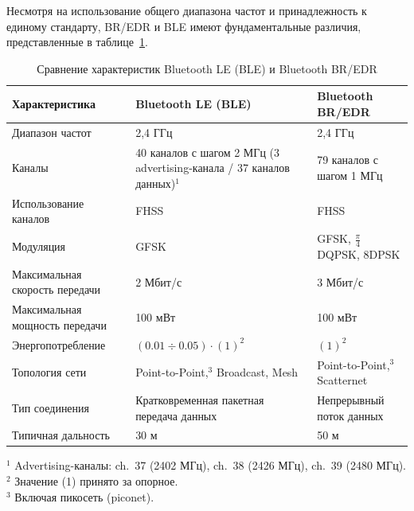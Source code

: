 Несмотря на использование общего диапазона частот и принадлежность к единому стандарту, BR/EDR и BLE имеют фундаментальные различия, представленные в таблице~\ref{tab:ble_bredr_compare}.

\begin{table}[H]
\centering
\caption{Сравнение характеристик Bluetooth LE (BLE) и Bluetooth BR/EDR}
\label{tab:ble_bredr_compare}
\renewcommand{\arraystretch}{1.3}

\begin{tabularx}{\textwidth}{|X|X|X|}
\hline
\textbf{Характеристика} & \textbf{Bluetooth LE (BLE)} & \textbf{Bluetooth BR/EDR} \\
\hline

Диапазон частот &
2{,}4 ГГц &
2{,}4 ГГц \\
\hline

Каналы &
40 каналов с шагом 2 МГц \newline
(3 advertising-канала / 37 каналов данных)$^{1}$ &
79 каналов с шагом 1 МГц \\
\hline

Использование каналов &
FHSS &
FHSS \\
\hline

Модуляция &
GFSK &
GFSK, $\frac{\pi}{4}$ DQPSK, 8DPSK \\
\hline

Максимальная скорость передачи &
2 Мбит/с &
3 Мбит/с \\
\hline

Максимальная мощность передачи &
100 мВт &
100 мВт \\
\hline

Энергопотребление &
$(0.01 \div 0.05)\cdot(1)^{2}$ &
$(1)^{2}$ \\
\hline

Топология сети &
Point-to-Point,$^{3}$ \newline
Broadcast, Mesh &
Point-to-Point,$^{3}$ \newline
Scatternet \\
\hline

Тип соединения &
Кратковременная пакетная передача данных &
Непрерывный поток данных \\
\hline

Типичная дальность &
30 м &
50 м \\
\hline

\end{tabularx}

\vspace{0.3cm}

\begin{flushleft}
\footnotesize
$^{1}$ Advertising-каналы: ch.~37 (2402 МГц), ch.~38 (2426 МГц), ch.~39 (2480 МГц). \\
$^{2}$ Значение (1) принято за опорное. \\
$^{3}$ Включая пикосеть (piconet).
\end{flushleft}

\end{table}

